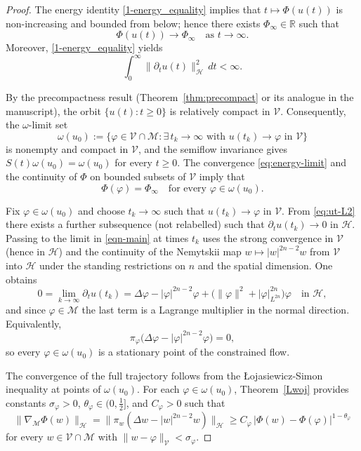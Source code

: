 \documentclass[reqno]{amsart}
\begin{document}
\begin{proof}
The energy identity \eqref{1-energy_equality} implies that $t\mapsto\Phi(u(t))$
is non-increasing
and bounded from below; hence there exists $\Phi_\infty\in\mathbb R$ such that
\begin{equation}\label{eq:energy-limit}
\Phi(u(t))\longrightarrow \Phi_\infty\quad\text{as }t\to\infty.
\end{equation}
Moreover, \eqref{1-energy_equality} yields
\begin{equation}\label{eq:ut-L2}
\int_0^\infty \|\partial_t u(t)\|_{\mathcal H}^2\,dt<\infty.
\end{equation}

By the precompactness result (Theorem~\ref{thm:precompact} or its analogue in the
manuscript),
the orbit $\{u(t):t\ge 0\}$ is relatively compact in $\mathcal V$. Consequently,
the $\omega$-limit set
\[
\omega(u_0):=\bigl\{\varphi\in\mathcal V\cap\mathcal M: \exists\,t_k\to\infty
\text{ with }u(t_k)\to\varphi\text{ in }\mathcal V\bigr\}
\]
is nonempty and compact in $\mathcal V$, and the semiflow invariance gives
$S(t)\omega(u_0)=\omega(u_0)$ for every $t\ge 0$.
The convergence \eqref{eq:energy-limit}
and the continuity of $\Phi$ on bounded subsets of $\mathcal V$ imply that
\begin{equation}\label{eq:energy-constant-omega}
\Phi(\varphi)=\Phi_\infty\quad\text{for every }\varphi\in\omega(u_0).
\end{equation}

Fix $\varphi\in\omega(u_0)$ and choose $t_k\to\infty$ such that $u(t_k)\to\varphi$ in
$\mathcal V$.
From \eqref{eq:ut-L2} there exists a further subsequence (not relabelled) such that
$\partial_t u(t_k)\to 0$ in $\mathcal H$. Passing to the limit in \eqref{eqn-main} at
times $t_k$ uses the strong convergence in $\mathcal V$ (hence in $\mathcal H$) and
the continuity of the
Nemytskii map $w\mapsto |w|^{2n-2}w$ from $\mathcal V$ into $\mathcal H$ under the
standing restrictions on $n$ and the spatial dimension. One obtains
\[
0=\lim_{k\to\infty}\partial_t u(t_k)
=\Delta \varphi-| \varphi|^{2n-2}\varphi + \bigl(\|\varphi\|^2
 +|\varphi|_{L^{2n}}^{2n}\bigr)\varphi
\quad\text{in }\mathcal H,
\]
and since $\varphi\in\mathcal M$ the last term is a Lagrange multiplier in the normal
direction. Equivalently,
\[
\pi_{\varphi}\bigl(\Delta\varphi-|\varphi|^{2n-2}\varphi\bigr)=0,
\]
so every $\varphi\in\omega(u_0)$ is a stationary point of the constrained flow.

The convergence of the full trajectory follows from the \L{o}jasiewicz-Simon
inequality at points of $\omega(u_0)$.
For each $\varphi\in\omega(u_0)$, Theorem~\ref{Lwoj} provides constants
$\sigma_\varphi>0$, $\theta_\varphi\in(0,\tfrac12]$, and $C_\varphi>0$ such that
\begin{equation}\label{eq:LS-local-conv}
\|\nabla_{\!\mathcal M}\Phi(w)\|_{\mathcal H}
=\|\pi_w(\Delta w-|w|^{2n-2}w)\|_{\mathcal H}
\ge C_\varphi\,|\Phi(w)-\Phi(\varphi)|^{1-\theta_\varphi}
\end{equation}
for every $w\in\mathcal V\cap\mathcal M$ with $\|w-\varphi\|_{\mathcal V}<\sigma_\varphi$.


\end{proof}
\end{document}
